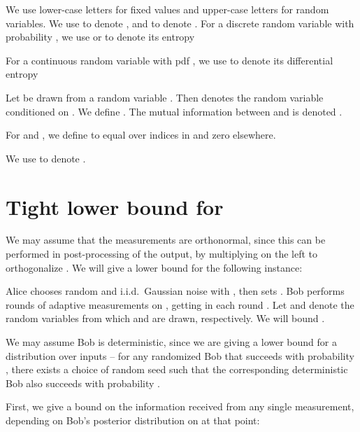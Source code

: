 \documentclass[twoside,leqno,twocolumn]{article}
\begin{document}
We use lower-case letters for fixed values and upper-case letters for
random variables.  We use  to denote , and 
to denote .  For a discrete random variable  with
probability , we use  or  to denote its entropy

For a continuous random variable  with pdf , we use  to
denote its differential entropy

Let  be drawn from a random variable .  Then  denotes the random variable  conditioned on .
We define .  The mutual
information between  and  is denoted .

For  and , we define  to
equal  over indices in  and zero elsewhere.

We use  to denote .

\section{Tight lower bound for  }

We may assume that the measurements are orthonormal, since this can be
performed in post-processing of the output, by multiplying  on the
left to orthogonalize .  We will give a lower bound for the
following instance:

Alice chooses random  and i.i.d.\ Gaussian noise 
with , then sets .  Bob performs  rounds of adaptive measurements on
, getting  in each round
.  Let  and  denote the random variables from which 
and  are drawn, respectively.  We will bound .

We may assume Bob is deterministic, since we are giving a lower bound
for a distribution over inputs -- for any randomized Bob that succeeds
with probability , there exists a choice of random seed such
that the corresponding deterministic Bob also succeeds with
probability .

First, we give a bound on the information received from any single
measurement, depending on Bob's posterior distribution on  at
that point:
\end{document}
